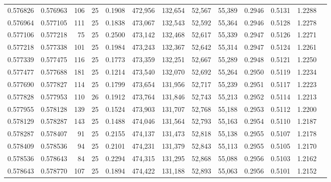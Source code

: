 \begin{tabular}{rrrrrrrrrrrrr}
0.576826 & 0.576963 &   106 &  25 &                                     0.1908 & 472,956 & 132,654 &  52,567 &  55,389 & 0.2946 & 0.5131 & 1.2288 \\
0.576964 & 0.577105 &   111 &  25 &                                     0.1838 & 473,067 & 132,543 &  52,592 &  55,364 & 0.2946 & 0.5128 & 1.2278 \\
0.577106 & 0.577218 &    75 &  25 &                                     0.2500 & 473,142 & 132,468 &  52,617 &  55,339 & 0.2947 & 0.5126 & 1.2271 \\
0.577218 & 0.577338 &   101 &  25 &                                     0.1984 & 473,243 & 132,367 &  52,642 &  55,314 & 0.2947 & 0.5124 & 1.2261 \\
0.577339 & 0.577475 &   116 &  25 &                                     0.1773 & 473,359 & 132,251 &  52,667 &  55,289 & 0.2948 & 0.5121 & 1.2250 \\
0.577477 & 0.577688 &   181 &  25 &                                     0.1214 & 473,540 & 132,070 &  52,692 &  55,264 & 0.2950 & 0.5119 & 1.2234 \\
0.577690 & 0.577827 &   114 &  25 &                                     0.1799 & 473,654 & 131,956 &  52,717 &  55,239 & 0.2951 & 0.5117 & 1.2223 \\
0.577828 & 0.577953 &   110 &  26 &                                     0.1912 & 473,764 & 131,846 &  52,743 &  55,213 & 0.2952 & 0.5114 & 1.2213 \\
0.577955 & 0.578128 &   139 &  25 &                                     0.1524 & 473,903 & 131,707 &  52,768 &  55,188 & 0.2953 & 0.5112 & 1.2200 \\
0.578129 & 0.578287 &   143 &  25 &                                     0.1488 & 474,046 & 131,564 &  52,793 &  55,163 & 0.2954 & 0.5110 & 1.2187 \\
0.578287 & 0.578407 &    91 &  25 &                                     0.2155 & 474,137 & 131,473 &  52,818 &  55,138 & 0.2955 & 0.5107 & 1.2178 \\
0.578409 & 0.578536 &    94 &  25 &                                     0.2101 & 474,231 & 131,379 &  52,843 &  55,113 & 0.2955 & 0.5105 & 1.2170 \\
0.578536 & 0.578643 &    84 &  25 &                                     0.2294 & 474,315 & 131,295 &  52,868 &  55,088 & 0.2956 & 0.5103 & 1.2162 \\
0.578643 & 0.578770 &   107 &  25 &                                     0.1894 & 474,422 & 131,188 &  52,893 &  55,063 & 0.2956 & 0.5101 & 1.2152 \\

\end{tabular}
